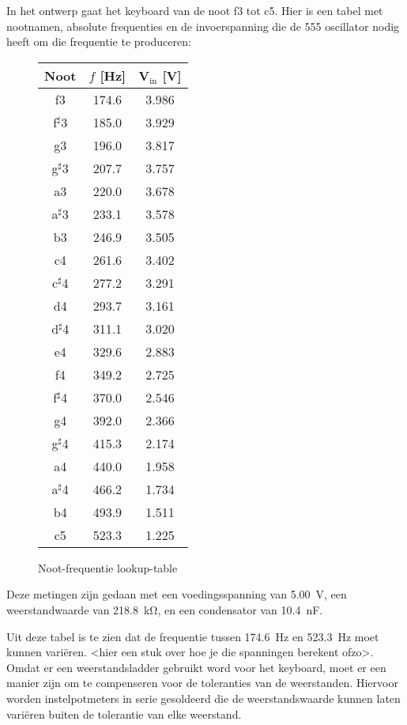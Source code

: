 \documentclass[12pt, a4paper, dutch]{article}
\newcommand{\s}{$^{\sharp}$}
\newcommand{\sub}[1]{$_{\text{#1}}$}
\begin{document}
In het ontwerp gaat het keyboard van de noot f3 tot c5. Hier is een tabel met
nootnamen, absolute frequenties en de invoerspanning die de 555 oscillator nodig
heeft om die frequentie te produceren:

\begin{figure}[H]
\centering
\begin{tabular}{ccc}
\toprule
Noot & $f$ [\si{\hertz}] & V\sub{in} [\si{\volt}]\\
\midrule
f3   & \num{174.6} & \num{3.986} \\
f\s3 & \num{185.0} & \num{3.929} \\
g3   & \num{196.0} & \num{3.817} \\
g\s3 & \num{207.7} & \num{3.757} \\
a3   & \num{220.0} & \num{3.678} \\
a\s3 & \num{233.1} & \num{3.578} \\
b3   & \num{246.9} & \num{3.505} \\
c4   & \num{261.6} & \num{3.402} \\
c\s4 & \num{277.2} & \num{3.291} \\
d4   & \num{293.7} & \num{3.161} \\
d\s4 & \num{311.1} & \num{3.020} \\
e4   & \num{329.6} & \num{2.883} \\
f4   & \num{349.2} & \num{2.725} \\
f\s4 & \num{370.0} & \num{2.546} \\
g4   & \num{392.0} & \num{2.366} \\
g\s4 & \num{415.3} & \num{2.174} \\
a4   & \num{440.0} & \num{1.958} \\
a\s4 & \num{466.2} & \num{1.734} \\
b4   & \num{493.9} & \num{1.511} \\
c5   & \num{523.3} & \num{1.225} \\
\bottomrule
\end{tabular}
\caption{Noot-frequentie lookup-table}
\end{figure}

Deze metingen zijn gedaan met een voedingsspanning van \SI{5.00}{\volt}, een
weerstandwaarde van \SI{218.8}{\kilo\ohm}, en een condensator van
\SI{10.4}{\nano\farad}.

Uit deze tabel is te zien dat de frequentie tussen \SI{174.6}{\hertz} en
\SI{523.3}{\hertz} moet kunnen vari\"eren. <hier een stuk over hoe je die spanningen
berekent ofzo>. Omdat er een weerstandsladder gebruikt word voor het keyboard, moet
er een manier zijn om te compenseren voor de toleranties van de weerstanden. Hiervoor
worden instelpotmeters in serie gesoldeerd die de weerstandswaarde kunnen laten
vari\"eren buiten de tolerantie van elke weerstand.
\end{document}
